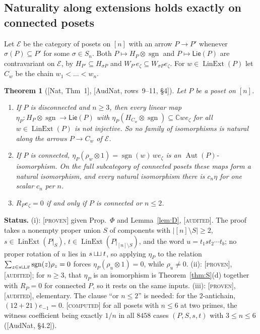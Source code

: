 \documentclass[11pt]{article}
\newtheorem{theorem}{Theorem}[section]
\theoremstyle{definition}
\theoremstyle{remark}
\newcommand{\Lin}{\operatorname{LinExt}}
\newcommand{\Aut}{\operatorname{Aut}}
\newcommand{\sgn}{\operatorname{sgn}}
\newcommand{\PLie}{\mathsf{Lie}}
\newcommand{\shuf}{\mathbin{\sqcup\mkern-3mu\sqcup}}
\newcommand{\st}[1]{\textup{[\textsc{#1}]}}
\begin{document}
\subsection{Naturality along extensions holds exactly on connected posets}

Let $\mathcal E$ be the category of posets on $[n]$ with an arrow $P\to P'$
whenever $\sigma(P)\subseteq P'$ for some $\sigma\in S_n$. Both
$P\mapsto H_P\otimes\sgn$ and $P\mapsto\PLie(P)$ are contravariant on
$\mathcal E$, by $H_{P'}\subseteq H_{\sigma P}$ and
$W_{P'}e_\zeta\subseteq W_{\sigma P}e_\zeta$. For $w\in\Lin(P)$ let $C_w$ be
the chain $w_1<\dots<w_n$.

\begin{theorem}[{[Nat, Thm~1]}, {[AudNat, rows~9--11, \S4]}]\label{thm:ext}
Let $P$ be a poset on $[n]$.
\begin{enumerate}[label=(\roman*)]
\item If $P$ is disconnected and $n\ge3$, then every linear map
  $\eta_P:H_P\otimes\sgn\to\PLie(P)$ with
  $\eta_P(H_{C_w}\otimes\sgn)\subseteq\mathbb Cwe_\zeta$ for all
  $w\in\Lin(P)$ is \emph{not injective}. So no family of isomorphisms is
  natural along the arrows $P\to C_w$ of $\mathcal E$.
\item If $P$ is connected, $\eta_P(\rho_w\otimes1)=\sgn(w)\,we_\zeta$ is an
  $\Aut(P)$-isomorphism. On the full subcategory of connected posets these
  maps form a natural isomorphism, and every natural isomorphism there is
  $c_n\eta$ for one scalar $c_n$ per $n$.
\item $R_Pe_\zeta=0$ if and only if $P$ is connected or $n\le2$.
\end{enumerate}
\end{theorem}

\noindent\textbf{Status.} (i): \st{proven} given Prop.~$\Phi$ and
Lemma~\ref{lem:D}, \st{audited}. The proof takes a nonempty proper union $S$
of components with $|[n]\setminus S|\ge2$, $s\in\Lin(P|_S)$,
$t\in\Lin(P|_{[n]\setminus S})$, and the word $u=t_1st_2\cdots t_b$; no
proper rotation of $u$ lies in $s\shuf t$, so applying $\eta_P$ to the
relation $\sum_{z\in s\shuf t}\sgn(z)\rho_z=0$ forces $\eta_P(\rho_u\otimes1)=0$,
while $\rho_u\ne0$. (ii): \st{proven}, \st{audited}; for $n\ge3$, that $\eta_P$ is an
isomorphism is Theorem~\ref{thm:S}(d) together with $R_P=0$ for connected
$P$, so it rests on the same inputs. (iii): \st{proven}, \st{audited},
elementary. The clause ``or $n\le2$'' is needed: for the $2$-antichain,
$(12+21)e_{-1}=0$. \st{computed} for all posets with $n\le6$ at two primes,
the witness coefficient being exactly $1/n$ in all $8458$ cases
$(P,S,s,t)$ with $3\le n\le6$ ([AudNat, \S4.2]).
\end{document}
